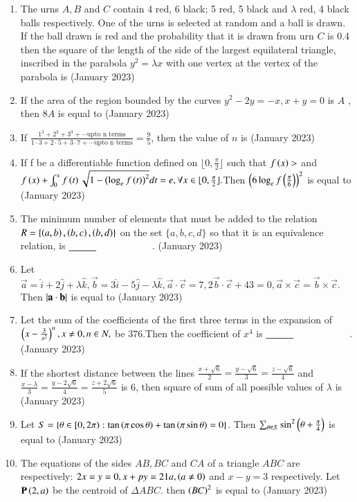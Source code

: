\documentclass[journal,12pt,onecolumn]{IEEEtran}
\theoremstyle{remark}
\begin{document}
\begin{enumerate}
    \item The urns $A, B$ and $C$ contain 4 red, 6 black; 5 red, 5 black and $\lambda$ red, 4 black balls respectively. One of the urns is selected at random and a ball is drawn. If the ball drawn is red and the probability that it is drawn from urn $C$ is 0.4 then the square of the length of the side of the largest equilateral triangle, inscribed in the parabola $y^2 = \lambda x$ with one vertex at the vertex of the parabola is
\hfill{(January 2023)}
\item If the area of the region bounded by the curves $y^2-2y=-x,x+y=0$ is $A$ , then $8A$ is equal to
\hfill{(January 2023)}
\item If $\frac{1^3+2^3+3^3+\cdots \text{upto n terms}}{1\cdot 3+2\cdot 5+3 \cdot 7+\cdots\text{upto n terms}}=\frac{9}{5}$, then the value of $n$ is
    \hfill{(January 2023)}
    \item If f be a differentiable function defined on $\lfloor 0,\frac{\pi}{2} \rfloor $ such that $f\left(x\right)>$ and $f\left(x\right)+\int_{0}^{x}f\left(t\right)\sqrt{1-\left(\log_ef\left(t\right)\right)^2}dt=e,\forall x \in \lfloor 0,\frac{\pi}{2} \rfloor.$Then $\left(6\log_ef\left(\frac{\pi}{6}\right)\right)^2$ is equal to
    \hfill{(January 2023)}
    \item The minimum number of elements that must be added to the relation $R = \{\left(a, b\right), \left(b, c\right), \left(b, d\right)\}$ on the set $\{a, b, c, d\}$ so that it is an equivalence relation, is $\makebox[3cm][l]{\underline{\hspace{1cm}}}$.
    \hfill{(January 2023)}
    \item Let $\vec{a}=\hat{i}+2\hat{j}+\lambda\hat{k},\vec{b}=3\hat{i}-5\hat{j}-\lambda\hat{k},\vec{a}\cdot\vec{c}=7,2\vec{b}\cdot\vec{c}+43=0,\vec{a}\times\vec{c}=\vec{b}\times\vec{c}.$ Then $\left\vert\mathbf{a}\cdot\mathbf{b}\right\vert$ is equal to
    \hfill{(January 2023)}
    \item Let the sum of the coefficients of the first three terms in the expansion of $\left(x-\frac{3}{x^2}\right)^n,x\neq 0,n \in N,$ be 376.Then the coefficient of $x^4$ is $\makebox[3cm][l]{\underline{\hspace{1cm}}}$.
    \hfill{(January 2023)}
    \item If the shortest distance between the lines $\frac{x
    +\sqrt{6}}{2}=\frac{y-\sqrt{6}}{3}=\frac{z-\sqrt{6}}{4}$ and $\frac{x-\lambda}{3}=\frac{y-2\sqrt{6}}{4}=\frac{z+2\sqrt{6}}{5}$ is 6, then square of sum of all possible values of $\lambda$ is 
    \hfill{(January 2023)}
    \item Let $S=\{\theta \in [0,2\pi):\tan\left(\pi\cos\theta\right)+\tan\left(\pi\sin\theta\right)=0\}$. Then $\sum_{\theta \in S}\sin^2\left(\theta+\frac{\pi}{4}\right)$ is equal to
    \hfill{(January 2023)}
    \item The equations of the sides $AB,BC$ and $CA$ of a triangle $ABC $ are respectively: $2x=y=0,x+py=21a,\left(a\neq 0\right)$ and $x-y=3$ respectively. Let $\mathbf{P}\left(2,a\right)$ be the centroid of $\Delta ABC$. then $\left(BC\right)^2$ is equal to
\hfill{(January 2023)}
\end{enumerate}
\end{document}

